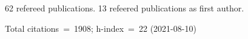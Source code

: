 62 refereed publications. 13 refeered publications as first author.

Total citations~=~1908; h-index~=~22 (2021-08-10)